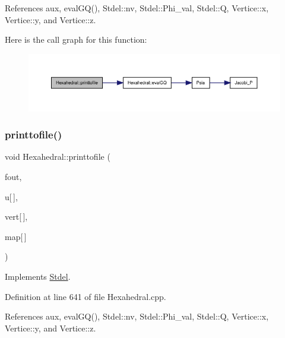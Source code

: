 References aux, eval\+G\+Q(), Stdel\+::nv, Stdel\+::\+Phi\+\_\+val, Stdel\+::Q, Vertice\+::x, Vertice\+::y, and Vertice\+::z.

Here is the call graph for this function\+:
\nopagebreak
\begin{figure}[H]
\begin{center}
\leavevmode
\includegraphics[width=350pt]{classHexahedral_a062fb995d31193f800fbf12ff7f19571_cgraph}
\end{center}
\end{figure}
\mbox{\label{classHexahedral_a50af1e899b7b2642cbe7a2291e949ad3}} 
\subsubsection{\texorpdfstring{printtofile()}{printtofile()}\hspace{0.1cm}{\footnotesize\ttfamily [2/2]}}
{\footnotesize\ttfamily void Hexahedral\+::printtofile (\begin{DoxyParamCaption}\item[{F\+I\+LE $\ast$}]{fout,  }\item[{const double}]{u\mbox{[}$\,$\mbox{]},  }\item[{const \hyperlink{structVertice}{Vertice}}]{vert\mbox{[}$\,$\mbox{]},  }\item[{const int}]{map\mbox{[}$\,$\mbox{]} }\end{DoxyParamCaption})\hspace{0.3cm}{\ttfamily [virtual]}}



Implements \hyperlink{classStdel_a6863f8aeb8e4fb01299b109b0dd3fe13}{Stdel}.



Definition at line 641 of file Hexahedral.\+cpp.



References aux, eval\+G\+Q(), Stdel\+::nv, Stdel\+::\+Phi\+\_\+val, Stdel\+::Q, Vertice\+::x, Vertice\+::y, and Vertice\+::z.

